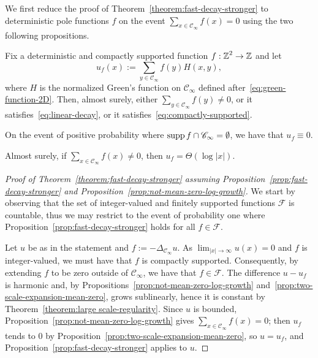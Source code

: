 \documentclass[12pt]{amsart}
\numberwithin{equation}{section}
\begin{document}
	We first reduce the proof of Theorem~\ref{theorem:fast-decay-stronger} to deterministic pole functions $f$ on the event $\sum_{x \in \mathscr{C}_\infty} f(x) = 0$ using the two following propositions.
	\begin{prop} \label{prop:fast-decay-stronger}
		Fix a deterministic and compactly supported function $f : \operatorname{\mathbb{Z}}^2 \to \operatorname{\mathbb{Z}}$ and let 
		\begin{equation} \label{eq:green-potential}
			u_f(x) := \sum_{y \in \mathscr{C}_\infty} f(y) H(x , y),
		\end{equation}
		where $H$ is the normalized Green's function on $\mathscr{C}_{\infty}$ defined after~\eqref{eq:green-function-2D}. 
		Then, almost surely, either $\sum_{y \in \mathscr{C}_\infty} f(y) \neq 0$, or it satisfies~\eqref{eq:linear-decay}, or it satisfies~\eqref{eq:compactly-supported}. 
	\end{prop}
	
	\begin{remark}
		On the event of positive probability where $\mathrm{supp\,} f \cap \mathscr{C}_\infty = \emptyset$, we have that $u_f \equiv 0$.
	\end{remark}
	
	\begin{prop} \label{prop:not-mean-zero-log-growth}
		Almost surely, if $\sum_{x \in \mathscr{C}_{\infty}} f(x) \neq 0$, then $u_f = \Theta(\log|x|)$.
	\end{prop}
	
	
	\begin{proof}[Proof of Theorem~\ref{theorem:fast-decay-stronger} assuming Proposition~\ref{prop:fast-decay-stronger} and Proposition~\ref{prop:not-mean-zero-log-growth}]
		We start by observing that the set of integer-valued and finitely supported functions $\mathscr{F}$ is countable, 
		thus we may restrict to the event of probability one where Proposition~\ref{prop:fast-decay-stronger} holds for all $f \in \mathscr{F}$. 
		
		Let $u$ be as in the statement and $f := -\Delta_{\mathscr{C}_{\infty}} u$. As $\lim_{|x| \to \infty} u(x) = 0$ and $f$ is integer-valued, we must have that $f$ is compactly supported. Consequently, 
		by extending $f$ to be zero outside of $\mathscr{C}_{\infty}$, we have that $f \in \mathscr{F}$. The difference $u - u_f$ is harmonic and, by Propositions~\ref{prop:not-mean-zero-log-growth} and~\ref{prop:two-scale-expansion-mean-zero}, grows sublinearly, hence it is constant by Theorem~\ref{theorem:large scale-regularity}. Since $u$ is bounded, Proposition~\ref{prop:not-mean-zero-log-growth} gives $\sum_{x \in \mathscr{C}_\infty} f(x) = 0$; then $u_f$ tends to $0$ by Proposition~\ref{prop:two-scale-expansion-mean-zero}, so $u = u_f$, and Proposition~\ref{prop:fast-decay-stronger} applies to $u$. 
	\end{proof} 
	
\end{document}
